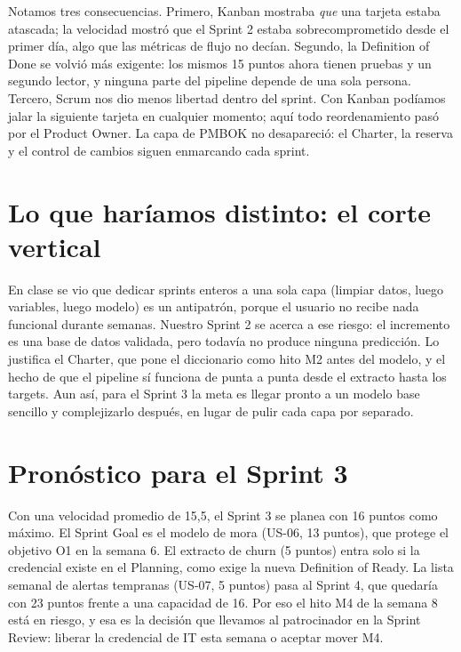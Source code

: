 \documentclass[10pt,a4paper]{article}
\begin{document}
Notamos tres consecuencias. Primero, Kanban mostraba \emph{que} una tarjeta estaba atascada; la velocidad mostró que
el Sprint 2 estaba sobrecomprometido desde el primer día, algo que las métricas de flujo no decían. Segundo, la
Definition of Done se volvió más exigente: los mismos 15 puntos ahora tienen pruebas y un segundo lector, y ninguna
parte del pipeline depende de una sola persona. Tercero, Scrum nos dio menos libertad dentro del sprint. Con Kanban
podíamos jalar la siguiente tarjeta en cualquier momento; aquí todo reordenamiento pasó por el Product Owner. La capa de
PMBOK no desapareció: el Charter, la reserva y el control de cambios siguen enmarcando cada sprint.

\section{Lo que haríamos distinto: el corte vertical}
En clase se vio que dedicar sprints enteros a una sola capa (limpiar datos, luego variables, luego modelo) es un
antipatrón, porque el usuario no recibe nada funcional durante semanas. Nuestro Sprint 2 se acerca a ese riesgo: el
incremento es una base de datos validada, pero todavía no produce ninguna predicción. Lo justifica el Charter, que pone
el diccionario como hito M2 antes del modelo, y el hecho de que el pipeline sí funciona de punta a punta desde el
extracto hasta los targets. Aun así, para el Sprint 3 la meta es llegar pronto a un modelo base sencillo y
complejizarlo después, en lugar de pulir cada capa por separado.

\section{Pronóstico para el Sprint 3}
Con una velocidad promedio de 15,5, el Sprint 3 se planea con 16 puntos como máximo. El Sprint Goal es el modelo de mora
(US-06, 13 puntos), que protege el objetivo O1 en la semana 6. El extracto de churn (5 puntos) entra solo si la
credencial existe en el Planning, como exige la nueva Definition of Ready. La lista semanal de alertas tempranas
(US-07, 5 puntos) pasa al Sprint 4, que quedaría con 23 puntos frente a una capacidad de 16. Por eso el hito M4 de la
semana 8 está en riesgo, y esa es la decisión que llevamos al patrocinador en la Sprint Review: liberar la credencial
de IT esta semana o aceptar mover M4.
\end{document}
